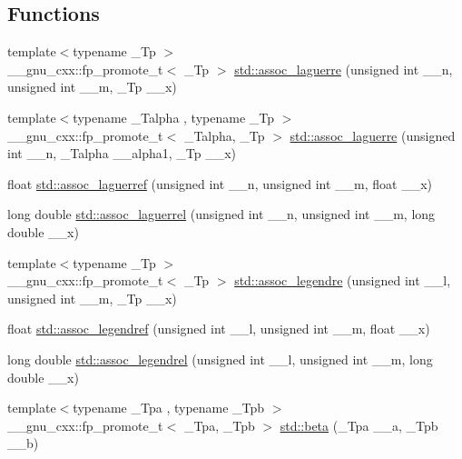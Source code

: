 \subsection*{Functions}
\begin{DoxyCompactItemize}
\item 
{\footnotesize template$<$typename \+\_\+\+Tp $>$ }\\\+\_\+\+\_\+gnu\+\_\+cxx\+::fp\+\_\+promote\+\_\+t$<$ \+\_\+\+Tp $>$ \hyperlink{group__mathsf__std_ga0b33e0ac3066f2353861ce2f34b43f57}{std\+::assoc\+\_\+laguerre} (unsigned int \+\_\+\+\_\+n, unsigned int \+\_\+\+\_\+m, \+\_\+\+Tp \+\_\+\+\_\+x)
\item 
{\footnotesize template$<$typename \+\_\+\+Talpha , typename \+\_\+\+Tp $>$ }\\\+\_\+\+\_\+gnu\+\_\+cxx\+::fp\+\_\+promote\+\_\+t$<$ \+\_\+\+Talpha, \+\_\+\+Tp $>$ \hyperlink{group__mathsf__std_gab135b6cb6154e6eccb7825ae939602db}{std\+::assoc\+\_\+laguerre} (unsigned int \+\_\+\+\_\+n, \+\_\+\+Talpha \+\_\+\+\_\+alpha1, \+\_\+\+Tp \+\_\+\+\_\+x)
\item 
float \hyperlink{group__mathsf__std_gaf83d98f350a1cfcebee6a1f723cf90d2}{std\+::assoc\+\_\+laguerref} (unsigned int \+\_\+\+\_\+n, unsigned int \+\_\+\+\_\+m, float \+\_\+\+\_\+x)
\item 
long double \hyperlink{group__mathsf__std_gac8e245671fb2df5de5fd978d03081f6c}{std\+::assoc\+\_\+laguerrel} (unsigned int \+\_\+\+\_\+n, unsigned int \+\_\+\+\_\+m, long double \+\_\+\+\_\+x)
\item 
{\footnotesize template$<$typename \+\_\+\+Tp $>$ }\\\+\_\+\+\_\+gnu\+\_\+cxx\+::fp\+\_\+promote\+\_\+t$<$ \+\_\+\+Tp $>$ \hyperlink{group__mathsf__std_ga7aa4182446f687094b12688078517d53}{std\+::assoc\+\_\+legendre} (unsigned int \+\_\+\+\_\+l, unsigned int \+\_\+\+\_\+m, \+\_\+\+Tp \+\_\+\+\_\+x)
\item 
float \hyperlink{group__mathsf__std_ga3ced07ddd24bf4af56e2712d148e7f57}{std\+::assoc\+\_\+legendref} (unsigned int \+\_\+\+\_\+l, unsigned int \+\_\+\+\_\+m, float \+\_\+\+\_\+x)
\item 
long double \hyperlink{group__mathsf__std_ga55977b425a539146f060dec1c8003344}{std\+::assoc\+\_\+legendrel} (unsigned int \+\_\+\+\_\+l, unsigned int \+\_\+\+\_\+m, long double \+\_\+\+\_\+x)
\item 
{\footnotesize template$<$typename \+\_\+\+Tpa , typename \+\_\+\+Tpb $>$ }\\\+\_\+\+\_\+gnu\+\_\+cxx\+::fp\+\_\+promote\+\_\+t$<$ \+\_\+\+Tpa, \+\_\+\+Tpb $>$ \hyperlink{group__mathsf__std_gacd36403ae64b89840b1504f97024dcee}{std\+::beta} (\+\_\+\+Tpa \+\_\+\+\_\+a, \+\_\+\+Tpb \+\_\+\+\_\+b)

\end{DoxyCompactItemize}
